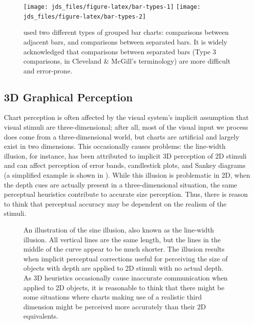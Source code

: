 \documentclass[letterpaper,inpress,dvipsnames]{jdsart}
\begin{document}
\begin{figure}
\texttt{[image: jds\_files/figure-latex/bar-types-1]} \texttt{[image: jds\_files/figure-latex/bar-types-2]} \caption{\citet{clevelandGraphical1984} used two different types of grouped bar charts: comparisons between adjacent bars, and comparisons between separated bars. It is widely acknowledged that comparisons between separated bars (Type 3 comparisons, in Cleveland \& McGill's terminology) are more difficult and error-prone.}\label{fig:bar-types}
\end{figure}

\hypertarget{d-graphical-perception}{%
\subsection{3D Graphical Perception}\label{d-graphical-perception}}

Chart perception is often affected by the visual system's implicit assumption that visual stimuli are three-dimensional; after all, most of the visual input we process does come from a three-dimensional world, but charts are artificial and largely exist in two dimensions.
This occasionally causes problems: the line-width illusion\citep{vanderplasSignsSineIllusion2015, daySineIllusion1991, hofmannCommonAnglePlots2013}, for instance, has been attributed to implicit 3D perception of 2D stimuli and can affect perception of error bands, candlestick plots, and Sankey diagrams (a simplified example is shown in \citet{fig:sine-illusion}).
While this illusion is problematic in 2D, when the depth cues are actually present in a three-dimensional situation, the same perceptual heuristics contribute to accurate size perception. Thus, there is reason to think that perceptual accuracy may be dependent on the realism of the stimuli.

\begin{figure}
\caption{An illustration of the sine illusion\citep{vanderplasSignsSineIllusion2015}, also known as the line-width illusion. All vertical lines are the same length, but the lines in the middle of the curve appear to be much shorter. The illusion results when implicit perceptual corrections useful for perceiving the size of objects with depth are applied to 2D stimuli with no actual depth. As 3D heuristics occasionally cause inaccurate communication when applied to 2D objects, it is reasonable to think that there might be some situations where charts making use of a realistic third dimension might be perceived more accurately than their 2D equivalents.}\label{fig:sine-illusion}
\end{figure}
\end{document}
